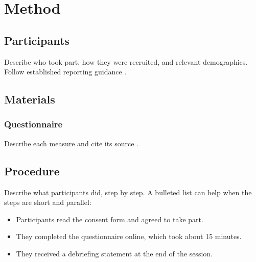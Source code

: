 \section{Method}

\subsection{Participants}

Describe who took part, how they were recruited, and relevant
demographics. Follow established reporting guidance
\parencite{apa2020}.

\subsection{Materials}

\subsubsection{Questionnaire}

Describe each measure and cite its source \parencite{garcia2018}.

\subsection{Procedure}

Describe what participants did, step by step. A bulleted list can help
when the steps are short and parallel:

\begin{itemize}
  \item Participants read the consent form and agreed to take part.
  \item They completed the questionnaire online, which took about
    15 minutes.
  \item They received a debriefing statement at the end of the session.
\end{itemize}
